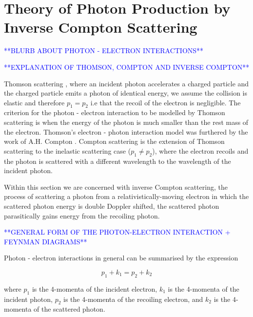 \documentclass[../main.tex]{subfiles}
\begin{document}
\chapter{Theory of Photon Production by Inverse Compton Scattering}
\label{Theory_of_Photon_Production_by_Inverse_Compton_Scattering} %

\textcolor{blue}{**BLURB ABOUT PHOTON - ELECTRON INTERACTIONS**}

\textcolor{blue}{**EXPLANATION OF THOMSON, COMPTON AND INVERSE COMPTON**}

Thomson scattering \cite{thomson1904xxxiv}, where an incident photon accelerates a charged particle and the charged particle emits a photon of identical energy, we assume the collision is elastic and therefore $p_{1} = p_{2}$ i.e that the recoil of the electron is negligible. The criterion for the photon - electron interaction to be modelled by Thomson scattering is when the energy of the photon is much smaller than the rest mass of the electron. Thomson's electron - photon interaction model was furthered by the work of A.H. Compton \cite{compton1923quantum}. Compton scattering is the extension of Thomson scattering to the inelastic scattering case ($p_{1} \neq p_{2}$), where the electron recoils and the photon is scattered with a different wavelength to the wavelength of the incident photon.

Within this section we are concerned with inverse Compton scattering, the process of scattering a photon from a relativistically-moving  electron in which the scattered photon energy is double Doppler shifted, the scattered photon parasitically gains energy from the recoiling photon.  

\textcolor{blue}{**GENERAL FORM OF THE PHOTON-ELECTRON INTERACTION + FEYNMAN DIAGRAMS**}

Photon - electron interactions in general can be summarised by the expression

\begin{equation}
p_{1} + k_{1} = p_{2} + k_{2}
\label{eq:ICS_process}
\end{equation}

where $p_{1}$ is the 4-momenta of the incident electron, $k_{1}$ is the 4-momenta of the incident photon, $p_{2}$ is the 4-momenta of the recoiling electron, and $k_{2}$ is the 4-momenta of the scattered photon.
\end{document}
